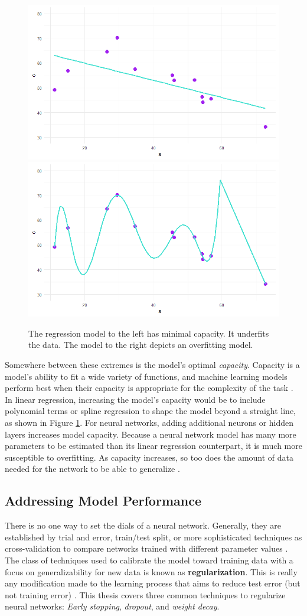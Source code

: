  \begin{figure}[H]
    \includegraphics[width=0.5\linewidth]{Figures/underfit.png}
    \includegraphics[width=0.5\linewidth]{Figures/overfit.png}
    \vspace{-20pt}
    \caption{\footnotesize{The regression model to the left has minimal capacity.  It underfits the data. The model to the right depicts an overfitting model.}}
    \label{capacityviz}
\end{figure}
 
 Somewhere between these extremes is the model's optimal \textit{capacity}.  Capacity is a model's ability to fit a wide variety of functions, and machine learning models perform best when their capacity is appropriate for the complexity of the task \cite{Goodfellow-et-al-2016}.  In linear regression, increasing the model's capacity would be to include polynomial terms or spline regression to shape the model beyond a straight line, as shown in Figure \ref{capacityviz}.  For neural networks, adding additional neurons or hidden layers increases model capacity.
 Because a neural network model has many more parameters to be estimated than its linear regression counterpart, it is much more susceptible to overfitting.  As capacity increases, so too does the amount of data needed for the network to be able to generalize \cite{baum1988size}.


\subsection{Addressing Model Performance}

There is no one way to set the dials of a neural network.  Generally, they are established by trial and error, train/test split, or more sophisticated techniques as cross-validation to compare networks trained with different parameter values \cite{mackay1992practical}.  The class of techniques used to calibrate the model toward training data with a focus on generalizability for new data is known as \textbf{regularization}.  This is really any modification made to the learning process that aims to reduce test error (but not training error) \cite{Goodfellow-et-al-2016}.  This thesis covers three common techniques to regularize neural networks: \textit{Early stopping}, \textit{dropout}, and \textit{weight decay}.

